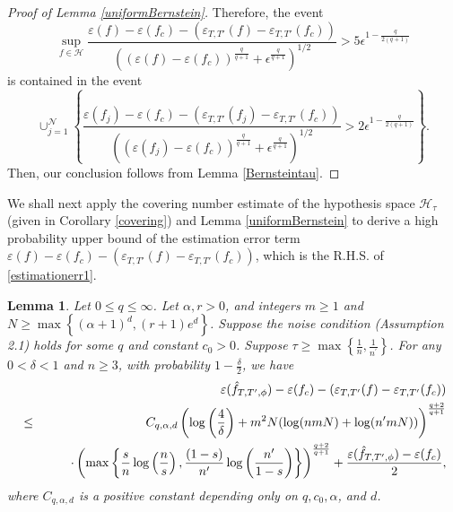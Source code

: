 \documentclass{article}
\newtheorem{lemma}{Lemma}
\begin{document}
\begin{proof}[Proof of Lemma \ref{uniformBernstein}]
Therefore, the event 
$$ \sup_{f\in {\mathcal H}} \frac{\varepsilon (f) - \varepsilon (f_c) - \left(\varepsilon_{T, T'} (f) - \varepsilon_{T, T'} (f_c)\right)}{\left(\left(\varepsilon (f) - \varepsilon (f_c)\right)^{\frac{q}{q+1}} + \epsilon^{\frac{q}{q+1}}\right)^{1/2}} > 5 \epsilon^{1-{\frac{q}{2(q+1)}}} $$
is contained in the event 
$$ \cup_{j=1}^{\mathcal N} \left\{\frac{\varepsilon (f_j) - \varepsilon (f_c) - \left(\varepsilon_{T, T'} (f_j) - \varepsilon_{T, T'} (f_c)\right)}{\left(\left(\varepsilon (f_j) - \varepsilon (f_c)\right)^{\frac{q}{q+1}} + \epsilon^{\frac{q}{q+1}}\right)^{1/2}}  >2 \epsilon^{1-{\frac{q}{2(q+1)}}}\right\}. $$
Then, our conclusion follows from Lemma \ref{Bernsteintau}. 
\end{proof}

We shall next apply the covering number estimate of the hypothesis space $\mathcal{H}_\tau$ (given in Corollary \ref{covering}) and Lemma \ref{uniformBernstein} to derive a high probability upper bound of the estimation
error term $\varepsilon (f) - \varepsilon (f_c) - \left(\varepsilon_{T, T'} (f) - \varepsilon_{T, T'} (f_c)\right)$, which is the R.H.S. of \eqref{estimationerr1}. 


\begin{lemma}\label{lemma:estimationII}
     Let $0\leq q \leq \infty$. Let $\alpha,r >0$, and integers $m \geq 1$ and \\$N \geq \max \left\{(\alpha +1)^d, (r+1)e^d\right\}$.
    Suppose the noise condition (Assumption 2.1) holds for some $q$ and constant $c_0>0$. Suppose $\tau \geq \max\left\{\frac{1}{n}, \frac{1}{n^\prime}\right\}$. 
    For any $0 <\delta < 1$ and $n\geq 3$, with probability $1-\frac{\delta}{2}$, we have 
\begin{eqnarray*}
  &&   \varepsilon (\Hat{f}_{T, T^\prime,\phi}) - \varepsilon (f_c) - \left(\varepsilon_{T, T'} (f) - \varepsilon_{T, T'} (f_c)\right)\\
 &\leq&  C_{q,\alpha, d} \left(\log \left(\frac{4}{\delta}\right) + m^2 N (\log(nmN)+\log(n^\prime mN))\right)^{\frac{q+2}{q+1}} \\
 &&\quad\quad\cdot\left(  \max\left\{  \frac{s}{n}
\log \left(\frac{n}{s}\right), \frac{(1-s)}{n^\prime}\log \left(\frac{n^\prime}{1-s}\right) \right\} \right)^{\frac{q+2}{q+1}} 
+ \frac{\varepsilon (\Hat{f}_{T, T^\prime,\phi}) - \varepsilon (f_c)}{2},
\end{eqnarray*}
where $C_{q,\alpha, d}$ is a positive constant depending only on $q,c_0, \alpha$, and $d$. 
\end{lemma}
\end{document}
